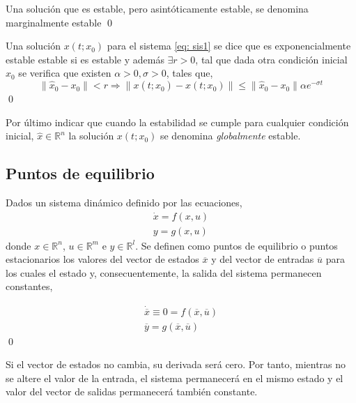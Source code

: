 \begin{definition}
Una solución que es estable, pero asintóticamente estable, se denomina marginalmente estable
\qed
\end{definition}

\begin{definition}
Una solución $x(t;x_0)$ para el sistema \ref{eq: sis1} se dice que es exponencialmente estable estable si es estable y además  $\exists r>0$, tal que dada otra condición inicial $\hat x_0$ se verifica que existen $\alpha>0 , \sigma >0$, tales que,
\begin{equation}
\|\hat x_0-x_0\|<r \Rightarrow \|x(t;\hat x_0) - x(t;x_0)\| \leq \|\hat x_0 - x_0\| \alpha e^{-\sigma t}
\end{equation}
\qed
\end{definition}

Por último indicar que cuando la estabilidad se cumple para cualquier condición inicial, $\hat x  \in \mathbb{R}^n$ la solución $x(t;x_0)$ se denomina \emph{globalmente} estable.


\subsection{Puntos de equilibrio} 
\begin{definition} Dados un sistema dinámico definido por las ecuaciones,
\begin{align}
\dot{x} = f(x,u)\\
y = g(x,u)
\end{align}
donde $x \in \mathbb{R}^n$, $u \in \mathbb{R}^m$ e $y \in \mathbb{R}^l$. Se definen como puntos de equilibrio o puntos estacionarios los valores del vector de estados $\overline x$ y del vector de entradas $\overline u$ para los cuales el estado y, consecuentemente, la salida del sistema permanecen constantes,

\begin{align}
\dot{\overline x} \equiv 0 = f(\overline x, \overline u)\\
\overline y = g(\overline x,\overline u)
\end{align}
\qed
\end{definition}

Si el vector de estados no cambia, su derivada será cero. Por tanto, mientras no se altere el valor de la entrada, el sistema permanecerá en el mismo estado y el valor del vector de salidas permanecerá también constante. 

